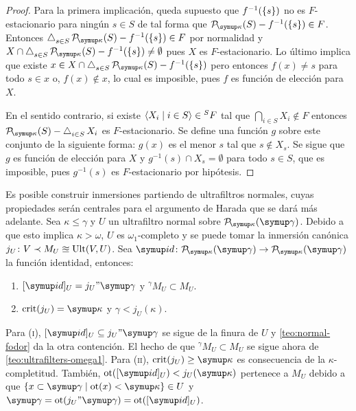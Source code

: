 \begin{proof}
    Para la primera implicación, queda supuesto que $f^{-1}(\left\{ s \right\})$ no es $F$-estacionario
    para ningún $s\in S$ de tal forma que $\pwset[\kappa]{S}-f^{-1}(\set{s}) \in F$.
    Entonces $\dint_{s\in S}\pwset[\kappa]{S}-f^{-1}(\set{s})\in F$ por normalidad
    y $X\cap \dint_{s\in S}\pwset[\kappa]{S}-f^{-1}(\set{s})\neq\emptyset$
    pues $X$ es $F$-estacionario. Lo último implica que existe
    $x\in X\cap \dint_{s\in S}\pwset[\kappa]{S}-f^{-1}(\set{s})$
    pero entonces $f(x)\neq s$ para todo $s\in x$ o,
    $f(x)\notin x$, lo cual es imposible, pues $f$ es función de elección para $X$.

    En el sentido contrario, si existe $\langle X_i\mid i\in S \rangle\in {}^SF$ tal que
    $\dint_{i\in S} X_i \notin F$ entonces $\pwset[\kappa]{S} - \dint_{i\in S} X_i$
    es $F$-estacionario. Se define una función $g$ sobre este conjunto de la siguiente
    forma: $g(x)$ es el menor $s$ tal que $s\notin X_s$. Se sigue que $g$ es función
    de elección para $X$ y $g^{-1}({s})\cap X_s=\emptyset$ para todo $s\in S$, que es
    imposible, pues $g^{-1}({s})$ es $F$-estacionario por hipótesis.
\end{proof}

Es posible construir inmersiones partiendo de ultrafiltros normales,
cuyas propiedades serán centrales para el argumento de Harada que se dará más adelante.
Sea $\kappa\leq\gamma$ y $U$ un ultrafiltro normal sobre $\pwset[\kappa]{\gamma}$.
Debido a que esto implica $\kappa > \omega$, $U$ es $\omega_1$-completo y se puede tomar
la inmersión canónica $j_U\colon V\prec M_U\approxeq\operatorname{Ult}(V,U)$.
Sea $\id\colon\pwset[\kappa]{\gamma}\to\pwset[\kappa]{\gamma}$ la función identidad, entonces:
\begin{enumerate}[label=(\roman*)]
    \item $[\id]_U = j_U"\gamma$ y ${}^\gamma M_U\subset M_U$.
    \item $\crit{j_U} = \kappa$ y $\gamma < j_U(\kappa)$.
\end{enumerate}

Para (\textsc{i}), $[\id]_U \subseteq j_U"\gamma$ se sigue de la finura de $U$ y
\ref{teo:normal-fodor} da la otra contención. El hecho de que ${}^\gamma M_U\subset M_U$
se sigue ahora de \ref{teo:ultrafilters-omega1}. Para (\textsc{ii}), $\crit{j_U}\geq\kappa$
es consecuencia de la $\kappa$-completitud. También, $\ot([\id]_U) < j_U(\kappa)$ pertenece
a $M_U$ debido a que $\set{x\subset\gamma\mid\ot(x)<\kappa}\in U$ y
$\gamma=\ot(j_U"\gamma)=\ot([\id]_U)$.

